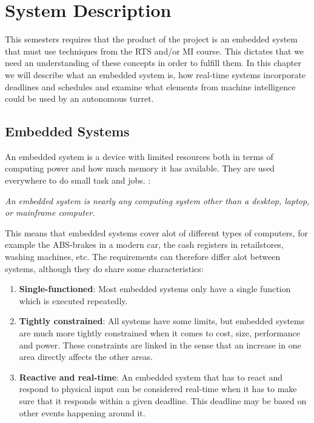\chapter{System Description}

This semesters requires that the product of the project is an embedded system
that must use techniques from the RTS and/or MI course. This dictates that we
need an understanding of these concepts in order to fulfill them. In this
chapter we will describe what an embedded system is, how real-time systems
incorporate deadlines and schedules and examine what elements from machine
intelligence could be used by an autonomous turret.

\section{Embedded Systems}
An embedded system is a device with limited resources both in terms of computing
power and how much memory it has available. They are used everywhere to do small task and
jobs. :\nl

\textit{An  embedded  system  is  nearly  any computing system other than a desktop,
laptop, or  mainframe  computer.}\nl

This means that embedded systems cover alot of different types of computers, for example
the ABS-brakes in a modern car, the cash registers in retailstores, washing machines, etc.
The requirements can therefore differ alot between systems, although they do
share some characteristics\citep[ch.1.1]{vahid1999embedded}:

\begin{enumerate}
  \item \textbf{Single-functioned}:  Most embedded systems only have a single
  function which is executed repeatedly.
  \item \textbf{Tightly constrained}: All systems have some limits, but
  embedded systems are much more tightly constrained when it comes to cost,
  size, performance and power. These constraints are linked in the sense that
  an increase in one area directly affects the other areas.
  \item \textbf{Reactive and real-time}: An embedded system that has to react
  and respond to physical input can be considered real-time when it has to make
  sure that it responds within a given deadline. This deadline may be based on
  other events happening around it.
\end{enumerate}
